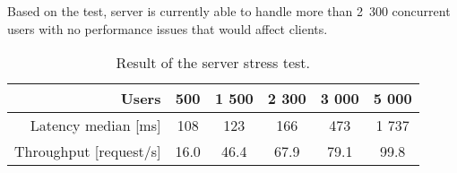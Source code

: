 Based on the test, server is currently able to handle more than 2~300 concurrent users with no performance issues that would affect clients.

\begin{table}
	\centering
	\begin{tabular}{r || c | c | c | c | c |}
		Users & 500 & 1 500 & 2 300 & 3 000 & 5 000 \\ \hline 
		Latency median [ms] & 108 & 123 & 166 & 473 & 1 737 \\
		Throughput [request/s] & 16.0 & 46.4 & 67.9 & 79.1 & 99.8 \\
	\end{tabular}
	\caption{Result of the server stress test.}
	\label{tab:loadtestresults}
\end{table}	

